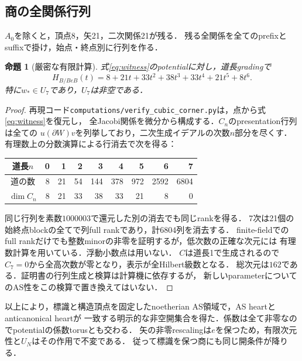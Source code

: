 \documentclass[11pt,a4paper]{ltjsarticle}
\newtheorem{proposition}[theorem]{命題}
\theoremstyle{definition}\newtheorem{remark}[theorem]{注意}
\begin{document}
\subsection{商の全関係行列}
$A_0$を除くと，頂点8，矢21，二次関係21が残る．
残る全関係を全てのprefixとsuffixで掛け，始点・終点別に行列を作る．
\begin{proposition}[厳密な有限計算]\label{prop:certificate}
式\eqref{eq:witness}のpotentialに対し，道長gradingで
\[
 H_{B/BeB}(t)=8+21t+33t^2+38t^3+33t^4+21t^5+8t^6.
\]
特に$w_*\in U_7$であり，$U_7$は非空である．
\end{proposition}
\begin{proof}
再現コード\texttt{computations/verify\_cubic\_corner.py}は，点から式\eqref{eq:witness}を復元し，
全Jacobi関係を微分から構成する．$C_n$のpresentation行列は全ての
$u(\partial W)v$を列挙しており，二次生成イデアルの次数$n$部分を尽くす．
有理数上の分数演算による行消去で次を得る：
\begin{center}
\begin{tabular}{c|rrrrrrrr}
道長$n$&0&1&2&3&4&5&6&7\\\hline
道の数&8&21&54&144&378&972&2592&6804\\
$\dim C_n$&8&21&33&38&33&21&8&0
\end{tabular}
\end{center}
同じ行列を素数$1000003$で還元した別の消去でも同じrankを得る．
7次は21個の始終点blockの全てで列full rankであり，計6804列を消去する．
finite-fieldでのfull rankだけでも整数minorの非零を証明するが，低次数の正確な次元には
有理数計算を用いている．浮動小数点は用いない．
$C$は道長1で生成されるので$C_7=0$から全高次数が零となり，表示が全Hilbert級数となる．
総次元は$162$である．証明書の行列生成と検算は計算機に依存するが，
新しいparameterについてのAS性をこの検算で置き換えてはいない．
\end{proof}

以上により，標識と構造頂点を固定したnoetherian AS領域で，AS heartとanticanonical heartが
一致する明示的な非空開集合を得た．係数は全て非零なのでpotentialの係数torusとも交わる．
矢の非零rescalingは$e$を保つため，有限次元性と$U_N$はその作用で不変である．
従って標識を保つ商にも同じ開条件が降りる．
\end{document}
